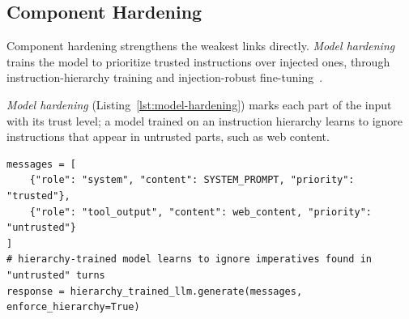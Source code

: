 \subsection{Component Hardening}

Component hardening strengthens the weakest links directly. \emph{Model hardening} trains the model to prioritize trusted instructions over injected ones, through instruction-hierarchy training and injection-robust fine-tuning~\cite{wallace2024hierarchy,chen2025secalign,chen2025struq}.

\emph{Model hardening} (Listing~\ref{lst:model-hardening}) marks each part of the input with its trust level; a model trained on an instruction hierarchy learns to ignore instructions that appear in untrusted parts, such as web content.

\begin{lstlisting}[caption={Model hardening: instruction-hierarchy training so the model privileges system instructions over injected content~\cite{wallace2024hierarchy}.}, label={lst:model-hardening}]
messages = [
    {"role": "system", "content": SYSTEM_PROMPT, "priority": "trusted"},
    {"role": "tool_output", "content": web_content, "priority": "untrusted"}
]
# hierarchy-trained model learns to ignore imperatives found in "untrusted" turns
response = hierarchy_trained_llm.generate(messages, enforce_hierarchy=True)
\end{lstlisting}




